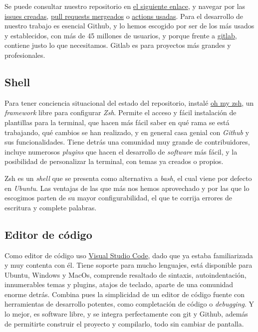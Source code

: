 Se puede consultar nuestro repositorio en \href{https://github.com/ElenaMerelo/TFG}{el siguiente enlace}, y navegar 
por las \href{https://github.com/ElenaMerelo/TFG/issues}{issues creadas}, \href{https://github.com/ElenaMerelo/TFG/pulls}{pull requests mergeados} 
o \href{https://github.com/ElenaMerelo/TFG/actions}{actions usadas}. Para el desarrollo de nuestro trabajo es esencial 
Github, y lo hemos escogido por ser de los más usados y establecidos, con más de 45 millones de usuarios, 
y porque frente a \href{https://about.gitlab.com/}{gitlab}, contiene justo lo que necesitamos. Gitlab es para proyectos 
más grandes y profesionales.

\subsection{Shell}
Para tener conciencia situacional del estado del repositorio, instalé \href{https://ohmyz.sh/}{oh my zsh}, 
un \textit{framework} libre para configurar \textit{Zsh}. Permite el acceso y fácil instalación de plantillas para 
la terminal, que hacen más fácil saber en qué rama se está trabajando, qué cambios se han realizado, y en 
general casa genial con \textit{Github} y sus funcionalidades. Tiene detrás una comunidad muy grande de 
contribuidores, incluye numerosos \textit{plugins} que hacen el desarrollo de \textit{software} más fácil, 
y la posibilidad de personalizar la terminal, con temas ya creados o propios.

{Zsh} es un \textit{shell} que se presenta como alternativa a \textit{bash}, el cual viene por defecto en 
\textit{Ubuntu}. Las ventajas de las que más nos hemos aprovechado y por las que lo escogimos parten de 
su mayor configurabilidad, el que te corrija errores de escritura y complete palabras.

\subsection{Editor de código}
Como editor de código uso \href{https://code.visualstudio.com/}{Visual Studio Code}, dado que ya estaba 
familiarizada y muy contenta con él. Tiene soporte para mucho lenguajes, está disponible para Ubuntu, Windows y 
MacOs, comprende resaltado de sintaxis, autoindentación, innumerables temas y plugins, atajos de teclado, 
aparte de una comunidad enorme detrás. Combina pues la simplicidad de un editor 
de código fuente con herramientas de desarrollo potentes, como completación de código o \textit{debugging}. Y lo mejor, 
es software libre, y se integra perfectamente con git y Github, además de permitirte construir el proyecto y compilarlo, 
todo sin cambiar de pantalla. 

